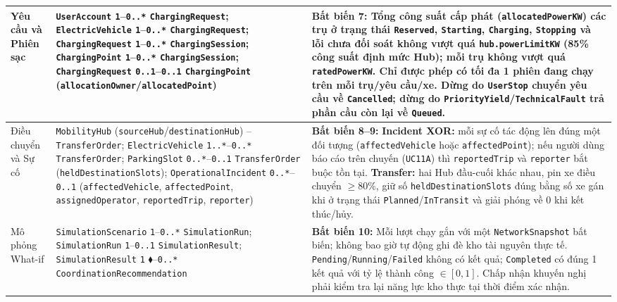 \begin{longtable}{>{\raggedright\arraybackslash}p{3.4cm} >{\raggedright\arraybackslash}p{4.8cm} >{\raggedright\arraybackslash}p{6.0cm}}
\midrule
Yêu cầu và Phiên sạc & \texttt{UserAccount} \texttt{1}--\texttt{0..*} \texttt{ChargingRequest}; \texttt{ElectricVehicle} \texttt{1}--\texttt{0..*} \texttt{ChargingRequest}; \texttt{ChargingRequest} \texttt{1}--\texttt{0..*} \texttt{ChargingSession}; \texttt{ChargingPoint} \texttt{1}--\texttt{0..*} \texttt{ChargingSession}; \texttt{ChargingRequest} \texttt{0..1}--\texttt{0..1} \texttt{ChargingPoint} (\texttt{allocation\allowbreak Owner}/\allowbreak\texttt{allocated\allowbreak Point}) & \textbf{Bất biến 7:} Tổng công suất cấp phát (\texttt{allocatedPowerKW}) các trụ ở trạng thái \texttt{Reserved}, \texttt{Starting}, \texttt{Charging}, \texttt{Stopping} và lỗi chưa đối soát không vượt quá \texttt{hub.powerLimitKW} (85\% công suất định mức Hub); mỗi trụ không vượt quá \texttt{ratedPowerKW}. Chỉ được phép có tối đa 1 phiên đang chạy trên mỗi trụ/yêu cầu/xe. Dừng do \texttt{UserStop} chuyển yêu cầu về \texttt{Cancelled}; dừng do \texttt{PriorityYield}/\texttt{TechnicalFault} trả phần cầu còn lại về \texttt{Queued}. \\
\midrule
Điều chuyển và Sự cố & \texttt{MobilityHub} (\texttt{sourceHub}/\texttt{destinationHub}) -- \texttt{TransferOrder}; \texttt{ElectricVehicle} \texttt{1..*}--\texttt{0..*} \texttt{TransferOrder}; \texttt{ParkingSlot} \texttt{0..*}--\texttt{0..1} \texttt{TransferOrder} (\texttt{heldDestinationSlots}); \texttt{OperationalIncident} \texttt{0..*}--\texttt{0..1} (\texttt{affectedVehicle}, \texttt{affectedPoint}, \texttt{assignedOperator}, \texttt{reportedTrip}, \texttt{reporter}) & \textbf{Bất biến 8--9:} \textbf{Incident XOR:} mỗi sự cố tác động lên đúng một đối tượng (\texttt{affectedVehicle} hoặc \texttt{affectedPoint}); nếu người dùng báo cáo trên chuyến (\texttt{UC11A}) thì \texttt{reportedTrip} và \texttt{reporter} bắt buộc tồn tại. \textbf{Transfer:} hai Hub đầu-cuối khác nhau, pin xe điều chuyển $\ge 80\%$, giữ số \texttt{heldDestinationSlots} đúng bằng số xe gán khi ở trạng thái \texttt{Planned}/\texttt{InTransit} và giải phóng về 0 khi kết thúc/hủy. \\
\midrule
Mô phỏng What-if & \texttt{SimulationScenario} \texttt{1}--\texttt{0..*} \texttt{SimulationRun}; \texttt{SimulationRun} \texttt{1}--\texttt{0..1} \texttt{SimulationResult}; \texttt{SimulationResult} \texttt{1} $\blacklozenge$--\texttt{0..*} \texttt{CoordinationRecommendation} & \textbf{Bất biến 10:} Mỗi lượt chạy gắn với một \texttt{NetworkSnapshot} bất biến; không bao giờ tự động ghi đè kho tài nguyên thực tế. \texttt{Pending}/\texttt{Running}/\texttt{Failed} không có kết quả; \texttt{Completed} có đúng 1 kết quả với tỷ lệ thành công $\in [0,1]$. Chấp nhận khuyến nghị phải kiểm tra lại năng lực kho thực tại thời điểm xác nhận. \\
\end{longtable}

